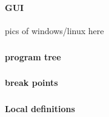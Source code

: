 \begin{frame}
    \frametitle{\subsecname}
    \framesubtitle{GUI}
    pics of windows/linux here
\end{frame}

\begin{frame}
    \frametitle{\subsecname}
    \framesubtitle{program tree}
\end{frame}

\begin{frame}
    \frametitle{\subsecname}
    \framesubtitle{break points}
\end{frame}

\begin{frame}
    \frametitle{\subsecname}
    \framesubtitle{Local definitions}
\end{frame}

